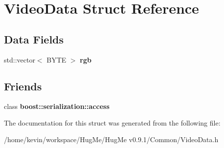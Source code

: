 \hypertarget{structVideoData}{
\section{VideoData Struct Reference}
\label{structVideoData}
}
\subsection*{Data Fields}
\begin{DoxyCompactItemize}
\item 
\hypertarget{structVideoData_a5f6935b6a9d244c18ce5e3165e2fe6b4}{
std::vector$<$ BYTE $>$ {\bfseries rgb}}
\label{structVideoData_a5f6935b6a9d244c18ce5e3165e2fe6b4}

\end{DoxyCompactItemize}
\subsection*{Friends}
\begin{DoxyCompactItemize}
\item 
\hypertarget{structVideoData_ac98d07dd8f7b70e16ccb9a01abf56b9c}{
class {\bfseries boost::serialization::access}}
\label{structVideoData_ac98d07dd8f7b70e16ccb9a01abf56b9c}

\end{DoxyCompactItemize}


The documentation for this struct was generated from the following file:\begin{DoxyCompactItemize}
\item 
/home/kevin/workspace/HugMe/HugMe v0.9.1/Common/VideoData.h\end{DoxyCompactItemize}
